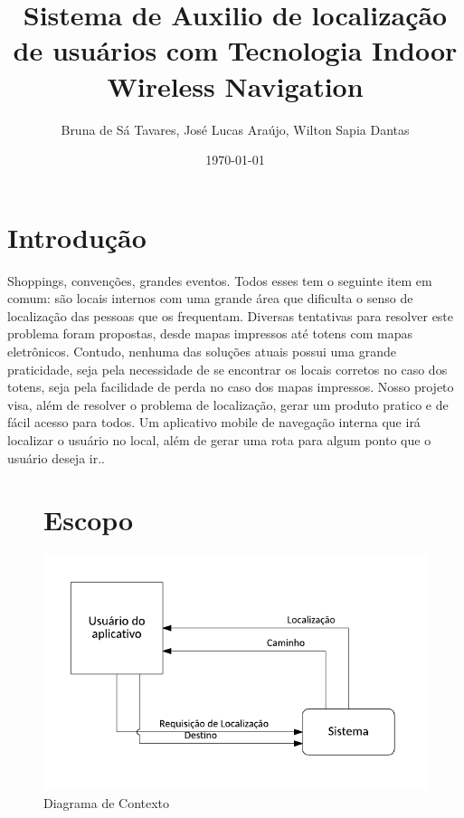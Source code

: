 \documentclass[12pt]{article}
\begin{document}
\title{Sistema de Auxilio de localização de usuários com Tecnologia Indoor Wireless Navigation}
\author{Bruna de Sá Tavares, José Lucas Araújo, Wilton Sapia Dantas}
\date{\today}
\maketitle  

\section*{Introdução}
	Shoppings, convenções, grandes eventos. Todos esses tem o seguinte item em comum: são locais internos com uma grande área que dificulta o senso de localização das pessoas que os frequentam. Diversas tentativas para resolver este problema foram propostas, desde mapas impressos até totens com mapas eletrônicos. Contudo, nenhuma das soluções atuais possui uma grande praticidade, seja pela necessidade de se encontrar os locais corretos no caso dos totens, seja pela facilidade de perda no caso dos mapas impressos. Nosso projeto visa, além de resolver o problema de localização, gerar um produto pratico e de fácil acesso para todos. Um aplicativo mobile de navegação interna que irá localizar o usuário no local, além de gerar uma rota para algum ponto que o usuário deseja ir.\cite{asthana1994indoor}.

\begin{figure}
	\section*{Escopo}
	\centering
	\includegraphics[scale=1.0]{diagramaContexto.PNG}
	\caption{Diagrama de Contexto}
\end{figure}
\end{document}
